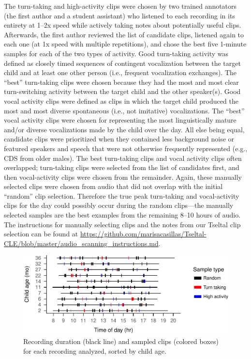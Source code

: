 \documentclass[floatsintext,man]{apa6}
\theoremstyle{definition}
\theoremstyle{definition}
\theoremstyle{definition}
\theoremstyle{remark}
\begin{document}
The turn-taking and high-activity clips were chosen by two trained
annotators (the first author and a student assistant) who listened to
each recording in its entirety at 1--2x speed while actively taking
notes about potentially useful clips. Afterwards, the first author
reviewed the list of candidate clips, listened again to each one (at 1x
speed with multiple repetitions), and chose the best five 1-minute
samples for each of the two types of activity. Good turn-taking activity
was defined as closely timed sequences of contingent vocalization
between the target child and at least one other person (i.e., frequent
vocalization exchanges). The \enquote{best} turn-taking clips were
chosen because they had the most and most clear turn-switching activity
between the target child and the other speaker(s). Good vocal activity
clips were defined as clips in which the target child produced the most
and most diverse spontaneous (i.e., not imitative) vocalizations. The
\enquote{best} vocal activity clips were chosen for representing the
most linguistically mature and/or diverse vocalizations made by the
child over the day. All else being equal, candidate clips were
prioritized when they contained less background noise or featured
speakers and speech that were not otherwise frequently represented
(e.g., CDS from older males). The best turn-taking clips and vocal
activity clips often overlapped; turn-taking clips were selected from
the list of candidates first, and then vocal-activity clips were chosen
from the remainder. Again, these manually selected clips were chosen
from audio that did not overlap with the initial \enquote{random} clip
selection. Therefore the true peak turn-taking and vocal-activity clips
for the day could possibly occur during the random clips---the manually
selected samples are the best examples from the remaining 8--10 hours of
audio. The instructions for manually selecting clips and the notes from
our Tseltal clip selection can be found at
\url{https://github.com/marisacasillas/Tseltal-CLE/blob/master/audio_scanning_instructions.md}.

\begin{figure}
\centering
\includegraphics{Tseltal-CLE_files/figure-latex/fig2-1.pdf}
\caption{\label{fig:fig2}Recording duration (black line) and sampled clips
(colored boxes) for each recording analyzed, sorted by child age.}
\end{figure}
\end{document}
